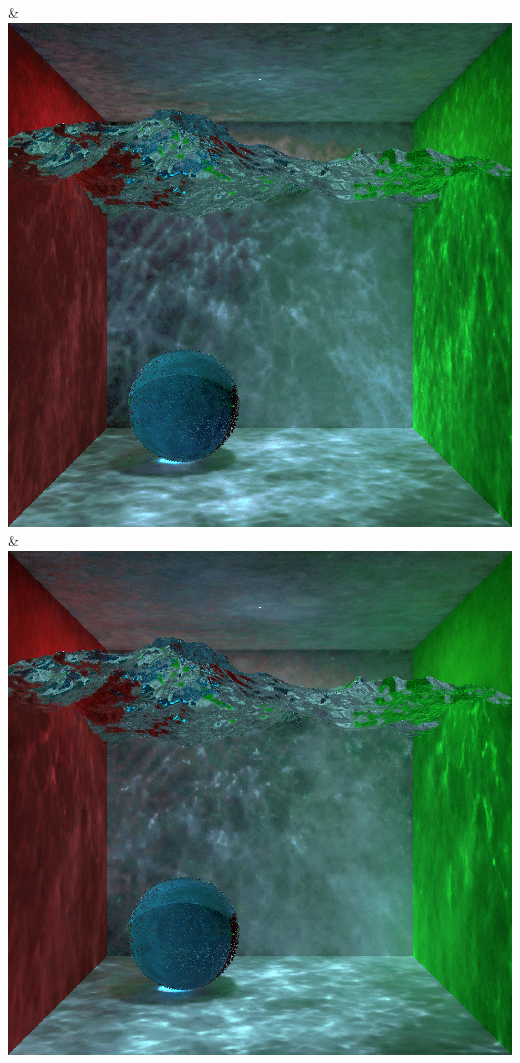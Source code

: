& \includegraphics[width=\linewidth]{figures/py/tests/quality_comparison/nrc+sppc14@1_1spp_caustics_small.png}
& \includegraphics[width=\linewidth]{figures/py/tests/quality_comparison/nrc+sppc14@4_1spp_caustics_small.png}
